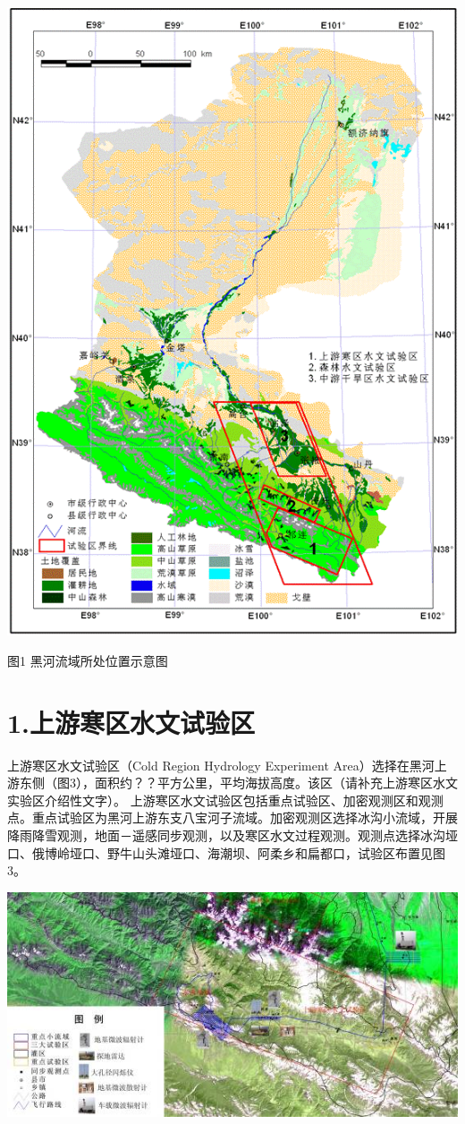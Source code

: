 \documentclass[letterpaper,10pt,english]{sphinxmanual}
\begin{document}
\includegraphics{experiment_heihe.png}

图1 黑河流域所处位置示意图


\section{1.上游寒区水文试验区}
\label{water_experiment_area:id2}
上游寒区水文试验区（Cold Region Hydrology Experiment Area）选择在黑河上游东侧（图3），面积约？？平方公里，平均海拔高度。该区（请补充上游寒区水文实验区介绍性文字）。
上游寒区水文试验区包括重点试验区、加密观测区和观测点。重点试验区为黑河上游东支八宝河子流域。加密观测区选择冰沟小流域，开展降雨降雪观测，地面－遥感同步观测，以及寒区水文过程观测。观测点选择冰沟垭口、俄博岭垭口、野牛山头滩垭口、海潮坝、阿柔乡和扁都口，试验区布置见图3。

\includegraphics{cold_region.jpg}
\end{document}
